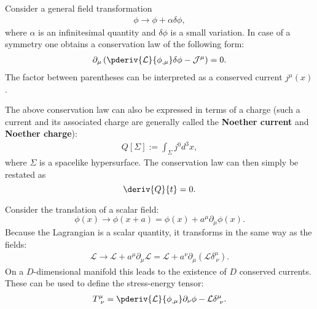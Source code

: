     \begin{theorem}\label{field:noethers_theorem}
        Consider a general field transformation
        \begin{gather}
            \phi\longrightarrow\phi+\alpha\delta\phi,
        \end{gather}
        where $\alpha$ is an infinitesimal quantity and $\delta\phi$ is a small variation. In case of a symmetry one obtains a conservation law of the following form:
        \begin{gather}
            \label{field:conserved_current}
            \partial_\mu\left(\pderiv{\mathcal{L}}{\phi_{,\mu}}\delta\phi - \mathcal{J}^\mu\right) = 0.
        \end{gather}
        The factor between parentheses can be interpreted as a conserved current $j^\mu(x)$.
    \end{theorem}
    The above conservation law can also be expressed in terms of a charge (such a current and its associated charge are generally called the \textbf{Noether current} and \textbf{Noether charge}):
    \begin{gather}
        \label{field:noether_charge}
        Q[\Sigma] := \int_\Sigma j^0d^3x,
    \end{gather}
    where $\Sigma$ is a spacelike hypersurface. The conservation law can then simply be restated as \[\deriv{Q}{t} = 0.\]

    \begin{definition}
        Consider the translation of a scalar field: \[\phi(x)\longrightarrow\phi(x+a) = \phi(x) + a^\mu\partial_\mu\phi(x).\] Because the Lagrangian is a scalar quantity, it transforms in the same way as the fields:
        \begin{gather}
            \mathcal{L}\longrightarrow\mathcal{L} + a^\mu\partial_\mu\mathcal{L} = \mathcal{L} + a^\nu\partial_\mu(\mathcal{L}\delta^\mu_{\ \nu}).
        \end{gather}
        On a $D$-dimensional manifold this leads to the existence of $D$ conserved currents. These can be used to define the stress-energy tensor:
        \begin{gather}
            \label{field:stress_energy_tensor}
            T^\mu_{\ \nu} = \pderiv{\mathcal{L}}{\phi_{,\mu}}\partial_\nu\phi - \mathcal{L}\delta^\mu_{\ \nu}.
        \end{gather}
    \end{definition}

